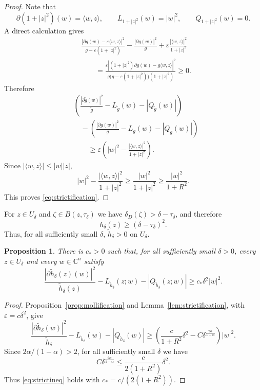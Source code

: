 \documentclass[12pt]{amsart}
\newtheorem{proposition}[theorem]{Proposition}
\newcommand{\C}{\mathbb C}
\begin{document}
\begin{proof}
Note that
\[
 \partial(1+|z|^2)(w)=\langle w,z\rangle,
 \qquad
 L_{1+|z|^2}(w)=|w|^2,
 \qquad
 Q_{1+|z|^2}(w)=0.
\]
A direct calculation gives
\[
\begin{aligned}
 &\frac{|\partial g(w)-\varepsilon\langle w,z\rangle|^2}
 {g-\varepsilon(1+|z|^2)}
 -\frac{|\partial g(w)|^2}{g}
 +\varepsilon\frac{|\langle w,z\rangle|^2}{1+|z|^2}\\
 &\qquad=
 \frac{\varepsilon\left|(1+|z|^2)\partial g(w)-g\langle w,z\rangle\right|^2}
 {g\bigl(g-\varepsilon(1+|z|^2)\bigr)(1+|z|^2)}\ge0.
\end{aligned}
\]
Therefore
\begin{align*}
 &\left(\frac{|\partial\widetilde g(w)|^2}{\widetilde g}
 -L_{\widetilde g}(w)-|Q_{\widetilde g}(w)|\right)\\
 &\quad-\left(\frac{|\partial g(w)|^2}{g}
 -L_g(w)-|Q_g(w)|\right)\\
 &\qquad\ge\varepsilon\left(
 |w|^2-\frac{|\langle w,z\rangle|^2}{1+|z|^2}\right).
\end{align*}
Since $|\langle w,z\rangle|\le|w||z|$,
\[
 |w|^2-\frac{|\langle w,z\rangle|^2}{1+|z|^2}
 \ge\frac{|w|^2}{1+|z|^2}
 \ge\frac{|w|^2}{1+R^2}.
\]
This proves \eqref{eq:strictification}.
\end{proof}

For $z\in U_\delta$ and $\zeta\in B(z,\tau_\delta)$ we have
$\delta_D(\zeta)>\delta-\tau_\delta$, and therefore
\[
 h_\delta(z)\ge(\delta-\tau_\delta)^2.
\]
Thus, for all sufficiently small $\delta$, $\widetilde h_\delta>0$ on
$U_\delta$.

\begin{proposition}\label{prop:strict}
There is $c_*>0$ such that, for all sufficiently small $\delta>0$,
every $z\in U_\delta$ and every $w\in\C^n$ satisfy
\begin{equation}\label{eq:strictineq}
 \frac{|\partial\widetilde h_\delta(z)(w)|^2}{\widetilde h_\delta(z)}
 -L_{\widetilde h_\delta}(z;w)-|Q_{\widetilde h_\delta}(z;w)|
 \ge c_*\delta^2|w|^2.
\end{equation}
\end{proposition}

\begin{proof}
Proposition~\ref{prop:mollification} and
Lemma~\ref{lem:strictification}, with $\varepsilon=c\delta^2$, give
\[
 \frac{|\partial\widetilde h_\delta(w)|^2}{\widetilde h_\delta}
 -L_{\widetilde h_\delta}(w)-|Q_{\widetilde h_\delta}(w)|
 \ge
 \left(\frac{c}{1+R^2}\delta^2
 -C\delta^{\frac{2\alpha}{1-\alpha}}\right)|w|^2.
\]
Since $2\alpha/(1-\alpha)>2$, for all sufficiently small $\delta$ we have
\[
 C\delta^{\frac{2\alpha}{1-\alpha}}
 \le \frac{c}{2(1+R^2)}\delta^2.
\]
Thus \eqref{eq:strictineq} holds with
$c_*=c/(2(1+R^2))$.
\end{proof}
\end{document}
